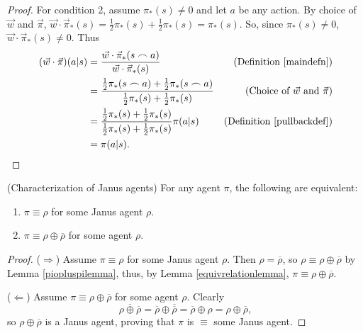 \documentclass[runningheads]{llncs}
\begin{document}
\begin{proof}
        For condition 2,
        assume $\pi_*(s)\not=0$ and let $a$ be any action.
        By choice of $\vec w$ and $\vec\pi$,
        $\vec w\cdot\vec\pi_*(s)=\frac12\pi_*(s)+\frac12\pi_*(s)=\pi_*(s)$.
        So, since $\pi_*(s)\not=0$, $\vec w\cdot\vec\pi_*(s)\not=0$.
        Thus
        \begin{align*}
            (\vec w\cdot\vec\pi)(a|s)
                &= \frac{\vec w\cdot \vec\pi_*(s\frown a)}{\vec w\cdot\vec\pi_*(s)}
                    &\mbox{(Definition \ref{maindefn})}\\
                &= \frac{\frac12\pi_*(s\frown a)+\frac12\pi_*(s\frown a)}
                    {\frac12\pi_*(s)+\frac12\pi_*(s)}
                    &\mbox{(Choice of $\vec w$ and $\vec\pi$)}\\
                &= \frac{\frac12\pi_*(s)+\frac12\pi_*(s)}{\frac12\pi_*(s)+\frac12\pi_*(s)}
                    \pi(a|s)
                    &\mbox{(Definition \ref{pullbackdef})}\\
                &= \pi(a|s).
        \end{align*}
\end{proof}

\begin{proposition}
    (Characterization of Janus agents)
    For any agent $\pi$, the following are equivalent:
    \begin{enumerate}
        \item $\pi\equiv\rho$ for some Janus agent $\rho$.
        \item $\pi\equiv\rho\oplus\overline{\rho}$ for some agent $\rho$.
    \end{enumerate}
\end{proposition}

\begin{proof}
    ($\Rightarrow$)
    Assume $\pi\equiv\rho$ for some Janus agent $\rho$.
    Then $\rho=\overline{\rho}$, so $\rho\equiv \rho\oplus\overline{\rho}$ by
    Lemma \ref{piopluspilemma}, thus, by Lemma \ref{equivrelationlemma},
    $\pi\equiv\rho\oplus\overline{\rho}$.

    ($\Leftarrow$)
    Assume $\pi\equiv\rho\oplus\overline{\rho}$ for some agent $\rho$.
    Clearly
    \[
        \overline{\rho\oplus\overline{\rho}}
        =
        \overline{\rho}\oplus\overline{\overline{\rho}}
        =
        \overline{\rho}\oplus\rho
        =
        \rho\oplus\overline{\rho},
    \]
    so $\rho\oplus\overline{\rho}$ is a Janus agent, proving that
    $\pi$ is $\equiv$ some Janus agent.
\end{proof}
\end{document}
